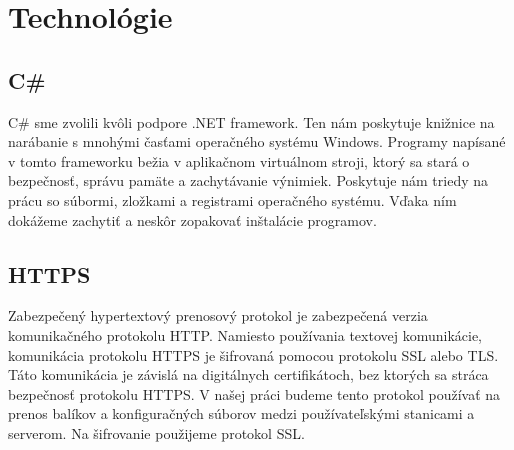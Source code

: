 \chapter{Technológie}

\section{C\#}
C\# sme zvolili kvôli podpore .NET framework. Ten nám poskytuje knižnice na narábanie s mnohými časťami operačného systému Windows. Programy napísané v tomto frameworku bežia v aplikačnom virtuálnom stroji, ktorý sa stará o bezpečnosť, správu pamäte a zachytávanie výnimiek. Poskytuje nám triedy na prácu so súbormi, zložkami a registrami operačného systému. Vďaka ním dokážeme zachytiť a neskôr zopakovať inštalácie programov.

\section{HTTPS}
Zabezpečený hypertextový prenosový protokol je zabezpečená verzia komunikačného protokolu HTTP. Namiesto používania textovej komunikácie, komunikácia protokolu HTTPS je šifrovaná pomocou protokolu SSL alebo TLS. Táto komunikácia je závislá na digitálnych certifikátoch, bez ktorých sa stráca bezpečnosť protokolu HTTPS. V našej práci budeme tento protokol používať na prenos balíkov a konfiguračných súborov medzi používateľskými stanicami a serverom. Na šifrovanie použijeme protokol SSL.